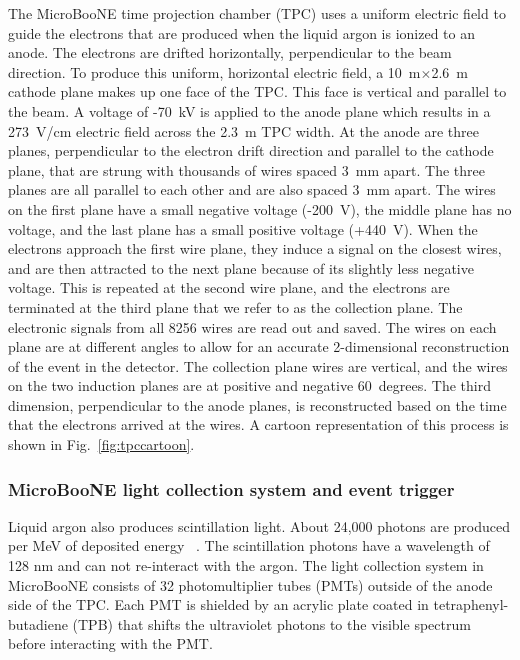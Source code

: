     The MicroBooNE time projection chamber (TPC) uses a uniform electric field
    to guide the electrons that are produced when the liquid argon is ionized
    to an anode. The electrons are drifted horizontally, perpendicular to the
    beam direction. To produce this uniform, horizontal electric field, a
    10~m$\times$2.6~m cathode plane makes up one face of the TPC. This face is
    vertical and parallel to the beam. A voltage of -70~kV is applied to the
    anode plane which results in a 273~V/cm electric field across the 2.3~m TPC
    width.  At the anode are three planes, perpendicular to the electron drift
    direction and parallel to the cathode plane, that are strung with thousands
    of wires spaced 3~mm apart.  The three planes are all parallel to each
    other and are also spaced 3~mm apart.  The wires on the first plane have a
    small negative voltage (-200~V), the middle plane has no voltage, and the
    last plane has a small positive voltage (+440~V). When the electrons
    approach the first wire plane, they induce a signal on the closest wires,
    and are then attracted to the next plane because of its slightly less
    negative voltage. This is repeated at the second wire plane, and the
    electrons are terminated at the third plane that we refer to as the
    collection plane. The electronic signals from all 8256 wires are read out
    and saved. The wires on each plane are at different angles to allow for an
    accurate 2-dimensional reconstruction of the event in the detector. The
    collection plane wires are vertical, and the wires on the two induction
    planes are at positive and negative 60~degrees. The third dimension,
    perpendicular to the anode planes, is reconstructed based on the time that
    the electrons arrived at the wires. A cartoon representation of this
    process is shown in Fig.~\ref{fig:tpccartoon}. 

  \subsubsection{MicroBooNE light collection system and event trigger}\label{sec:swtrigger}
    Liquid argon also produces scintillation light. About 24,000 photons are
    produced per MeV of deposited energy ~\cite{detectorpaper}. The
    scintillation photons have a wavelength of 128 nm and can not re-interact
    with the argon. The light collection system in MicroBooNE consists of
    32 photomultiplier tubes (PMTs) outside of the anode side of the
    TPC. Each PMT is shielded by an acrylic plate coated in
    tetraphenyl-butadiene (TPB) that shifts the ultraviolet photons to the
    visible spectrum before interacting with the PMT.

